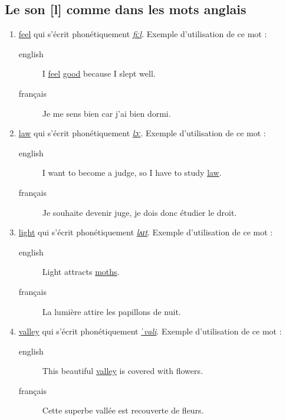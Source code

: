 \subsection{Le son [l] comme dans les mots anglais}
\label{sec:org273e167}
\begin{enumerate}
\item \href{http://www.wordreference.com/enfr/feel}{feel} qui s'écrit phonétiquement \href{https://en.oxforddictionaries.com/definition/feel}{\emph{fiːl}}. Exemple d'utilisation de ce
mot : 
\begin{description}
\item[{english}] \textenglish{I \href{https://youtu.be/4k4SP01l6rY}{feel} \href{https://youtu.be/DuDeBcpLITQ}{good} because I slept well.}
\item[{français}] Je me sens bien car j'ai bien dormi.
\end{description}
\item \href{http://www.wordreference.com/enfr/law}{law} qui s'écrit phonétiquement \href{https://en.oxforddictionaries.com/definition/law}{\emph{lɔː}}. Exemple d'utilisation de ce
mot :
\begin{description}
\item[{english}] \textenglish{I want to become a judge, so I have to study \href{https://youtu.be/GEy6ThJwE3s}{law}.}
\item[{français}] Je souhaite devenir juge, je dois donc étudier le droit.
\end{description}
\item \href{http://www.wordreference.com/enfr/light}{light} qui s'écrit phonétiquement \href{https://en.oxforddictionaries.com/definition/light}{\emph{lʌɪt}}. Exemple d'utilisation de ce
mot :
\begin{description}
\item[{english}] \textenglish{Light attracts \href{https://youtu.be/tSkCqj6T\_NQ}{moths}.}
\item[{français}] La lumière attire les papillons de nuit.
\end{description}
\item \href{http://www.wordreference.com/enfr/valley}{valley} qui s'écrit phonétiquement \href{https://en.oxforddictionaries.com/definition/valley}{\emph{ˈvali}}. Exemple d'utilisation de
ce mot :
\begin{description}
\item[{english}] \textenglish{This beautiful \href{https://youtu.be/wQFgG\_HsI0w}{valley} is covered with flowers.}
\item[{français}] Cette superbe vallée est recouverte de fleurs.
\end{description}
\end{enumerate}
